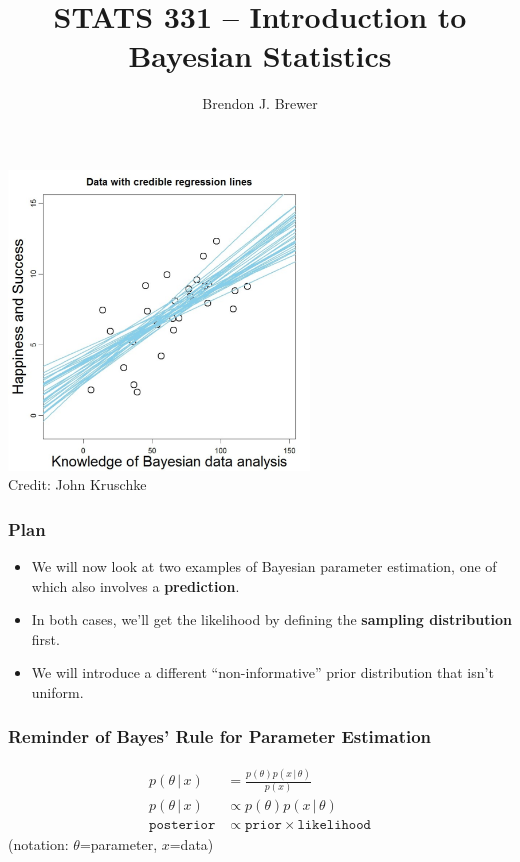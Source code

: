 \documentclass{beamer}
\author{Brendon J. Brewer}
\title{STATS 331 -- Introduction to Bayesian Statistics}
\institute{The University of Auckland}
\date{}
\newcommand{\given}{\,|\,}
\begin{document}
\frame{\titlepage}

\begin{frame}
\begin{center}
\includegraphics[width=0.6\textwidth]{images/happiness.png} \\
Credit: John Kruschke
\end{center}

\end{frame}


\begin{frame}
\frametitle{Plan}
\begin{itemize}
\item We will now look at two examples of Bayesian parameter estimation,
one of which also involves a {\bf prediction}.\pause
\item In both cases, we'll get the likelihood by defining the
{\bf sampling distribution} first.\pause
\item We will introduce a different ``non-informative'' prior distribution
that isn't uniform.
\end{itemize}

\end{frame}


\begin{frame}
\frametitle{Reminder of Bayes' Rule for Parameter Estimation}

\begin{align}
p(\theta \given x) &= \frac{p(\theta)p(x \given \theta)}{p(x)} \\
p(\theta \given x) &\propto p(\theta)p(x \given \theta) \\
\texttt{posterior} &\propto \texttt{prior} \times \texttt{likelihood}
\end{align}
(notation: $\theta$=parameter, $x$=data)

\end{frame}
\end{document}
